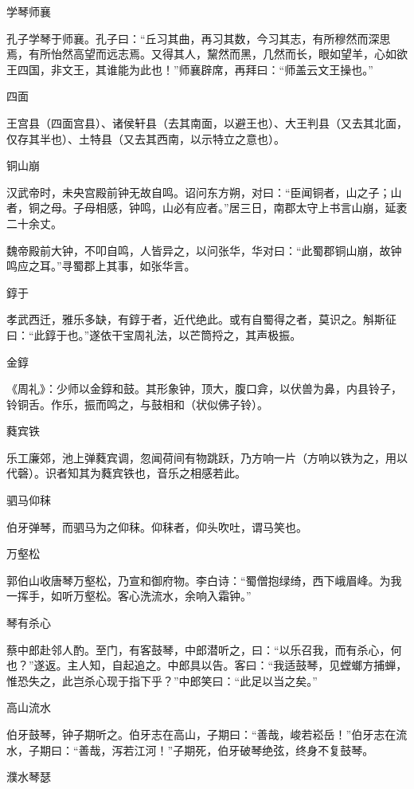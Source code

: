 \documentclass[a4paper,12pt,UTF8,twoside]{ctexbook}
\begin{document}
    学琴师襄
    
    孔子学琴于师襄。孔子曰：“丘习其曲，再习其数，今习其志，有所穆然而深思焉，有所怡然高望而远志焉。又得其人，黧然而黑，几然而长，眼如望羊，心如欲王四国，非文王，其谁能为此也！”师襄辟席，再拜曰：“师盖云文王操也。”
    
    四面
    
    王宫县（四面宫县）、诸侯轩县（去其南面，以避王也）、大王判县（又去其北面，仅存其半也）、土特县（又去其西南，以示特立之意也）。
    
    铜山崩
    
    汉武帝时，未央宫殿前钟无故自鸣。诏问东方朔，对曰：“臣闻铜者，山之子；山者，铜之母。子母相感，钟鸣，山必有应者。”居三日，南郡太守上书言山崩，延袤二十余丈。
    
    魏帝殿前大钟，不叩自鸣，人皆异之，以问张华，华对曰：“此蜀郡铜山崩，故钟鸣应之耳。”寻蜀郡上其事，如张华言。
    
    錞于
    
    孝武西迁，雅乐多缺，有錞于者，近代绝此。或有自蜀得之者，莫识之。斛斯征曰：“此錞于也。”遂依干宝周礼法，以芒筒捋之，其声极振。
    
    金錞
    
    《周礼》：少师以金錞和鼓。其形象钟，顶大，腹口弇，以伏兽为鼻，内县铃子，铃铜舌。作乐，振而鸣之，与鼓相和（状似佛子铃）。
    
    蕤宾铁
    
    乐工廉郊，池上弹蕤宾调，忽闻荷间有物跳跃，乃方响一片（方响以铁为之，用以代磬）。识者知其为蕤宾铁也，音乐之相感若此。
    
    驷马仰秣
    
    伯牙弹琴，而驷马为之仰秣。仰秣者，仰头吹吐，谓马笑也。
    
    万壑松
    
    郭伯山收唐琴万壑松，乃宣和御府物。李白诗：“蜀僧抱绿绮，西下峨眉峰。为我一挥手，如听万壑松。客心洗流水，余响入霜钟。”
    
    琴有杀心
    
    蔡中郎赴邻人酌。至门，有客鼓琴，中郎潜听之，曰：“以乐召我，而有杀心，何也？”遂返。主人知，自起追之。中郎具以告。客曰：“我适鼓琴，见螳螂方捕蝉，惟恐失之，此岂杀心现于指下乎？”中郎笑曰：“此足以当之矣。”
    
    高山流水
    
    伯牙鼓琴，钟子期听之。伯牙志在高山，子期曰：“善哉，峻若崧岳！”伯牙志在流水，子期曰：“善哉，泻若江河！”子期死，伯牙破琴绝弦，终身不复鼓琴。
    
    濮水琴瑟
    
\end{document}

